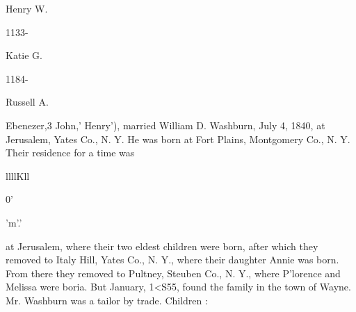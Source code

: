 \documentclass{book}
\begin{document}
Henry W. 


1133- 




Katie G. 


1184- 




Russell A. 



Ebenezer,3 John,' Henry'), married William D. Washburn, July 
4, 1840, at Jerusalem, Yates Co., N. Y. He was born at Fort 
Plains, Montgomery Co., N. Y. Their residence for a time was 



llllKll 



0' 





'm'.' 




at Jerusalem, where their two eldest children were born, after 
which they removed to Italy Hill, Yates Co., N. Y., where their 
daughter Annie was born. From there they removed to Pultney, 
Steuben Co., N. Y., where P'lorence and Melissa were boria. 
But January, 1<S55, found the family in the town of Wayne. 
Mr. Washburn was a tailor by trade. Children : 
\end{document}
